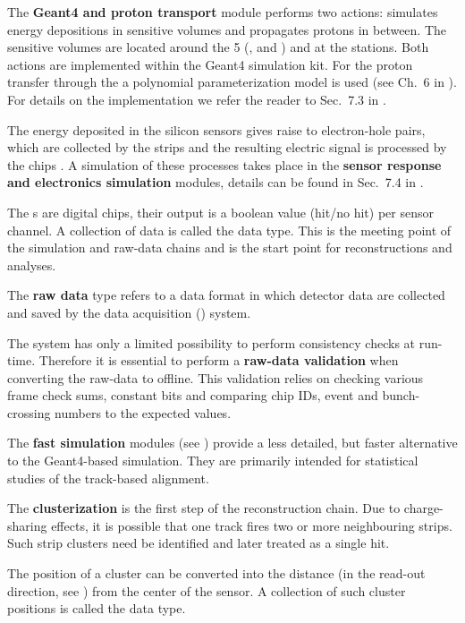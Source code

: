 \> The {\bf Geant4 and proton transport} module performs two actions: simulates energy depositions in sensitive volumes and propagates protons in between. The sensitive volumes are located around the 5 (,  and ) and at the  stations. Both actions are implemented within the Geant4  simulation kit. For the proton transfer through the  a polynomial parameterization model is used (see Ch.~6 in ). For details on the implementation we refer the reader to Sec.~7.3 in .

\> The energy deposited in the silicon sensors gives raise to electron-hole pairs, which are collected by the strips and the resulting electric signal is processed by the  chips . A simulation of these processes takes place in the {\bf sensor response and electronics simulation} modules, details can be found in Sec.~7.4 in .

\> The s are digital chips, their output is a boolean value (hit/no hit) per sensor channel. A collection of  data is called the {\bf {}} data type. This is the meeting point of the simulation and raw-data chains and is the start point for reconstructions and analyses.

\> The {\bf raw data} type refers to a data format in which detector data are collected and saved by the data acquisition () system.

\> The  system has only a limited possibility to perform consistency checks at run-time. Therefore it is essential to perform a {\bf raw-data validation} when converting the raw-data to  offline. This validation relies on checking various frame check sums, constant bits and comparing chip IDs, event and bunch-crossing numbers to the expected values.

\> The {\bf fast simulation} modules (see ) provide a less detailed, but faster alternative to the Geant4-based simulation. They are primarily intended for statistical studies of the track-based alignment.

\> The {\bf clusterization} is the first step of the reconstruction chain. Due to charge-sharing effects, it is possible that one track fires two or more neighbouring strips. Such strip clusters need be identified and later treated as a single hit.

\> The position of a cluster can be converted into the distance (in the read-out direction, see ) from the center of the sensor. A collection of such cluster positions is called the {\bf {}} data type.

